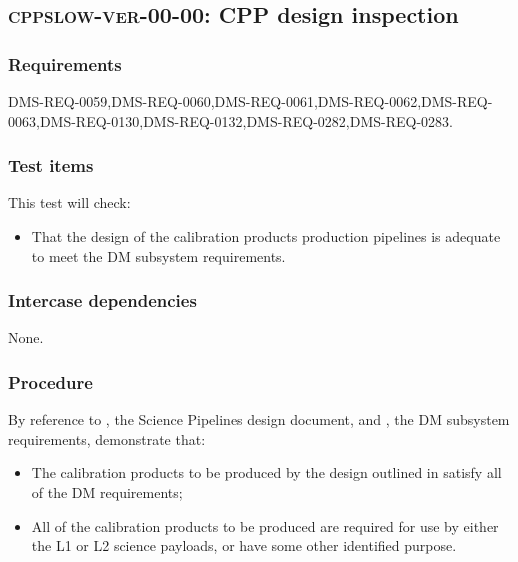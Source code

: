 \subsection{\textsc{cppslow-ver-00-00}: CPP design inspection}
\label{cppslow-ver-00-00}

\subsubsection{Requirements}

DMS-REQ-0059,DMS-REQ-0060,DMS-REQ-0061,DMS-REQ-0062,DMS-REQ-0063,DMS-REQ-0130,DMS-REQ-0132,DMS-REQ-0282,DMS-REQ-0283.

\subsubsection{Test items}

This test will check:

\begin{itemize}

  \item{That the design of the calibration products production pipelines is
  adequate to meet the DM subsystem requirements.}

\end{itemize}

\subsubsection{Intercase dependencies}

None.

\subsubsection{Procedure}

By reference to , the Science Pipelines design document, and
, the DM subsystem requirements, demonstrate that:

\begin{itemize}

  \item{The calibration products to be produced by the design outlined in
   satisfy all of the DM requirements;}
  \item{All of the calibration products to be produced are required for use by
  either the L1 or L2 science payloads, or have some other identified
  purpose.}

\end{itemize}

